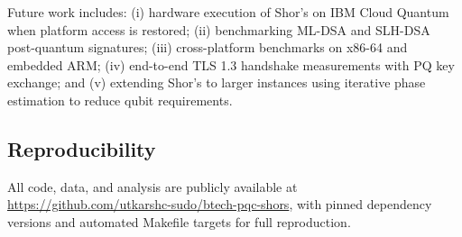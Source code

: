 \documentclass[conference]{IEEEtran}
\begin{document}
Future work includes: (i) hardware execution of Shor's on IBM Cloud Quantum when platform access is restored; (ii) benchmarking ML-DSA and SLH-DSA post-quantum signatures; (iii) cross-platform benchmarks on x86-64 and embedded ARM; (iv) end-to-end TLS 1.3 handshake measurements with PQ key exchange; and (v) extending Shor's to larger instances using iterative phase estimation to reduce qubit requirements.

\subsection*{Reproducibility}

All code, data, and analysis are publicly available at \url{https://github.com/utkarshc-sudo/btech-pqc-shors}, with pinned dependency versions and automated Makefile targets for full reproduction.



\end{document}
